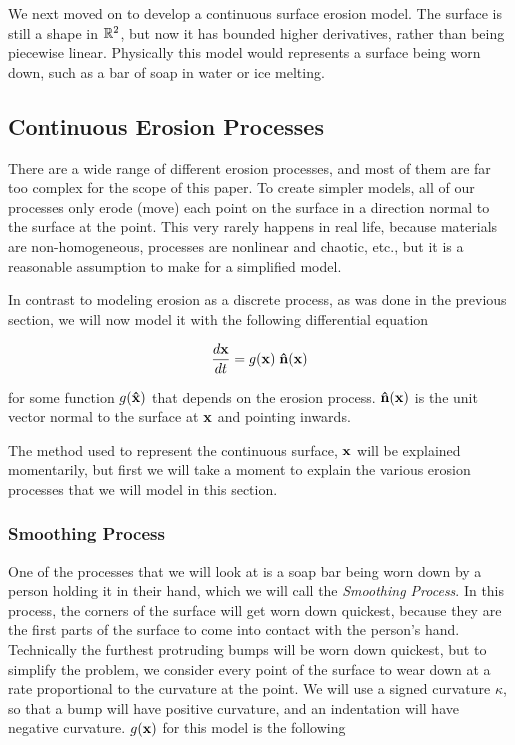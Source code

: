 We next moved on to develop a continuous surface erosion model. The surface is still a shape in $\mathbb R^2$, but now it has bounded higher derivatives, rather than being piecewise linear. Physically this model would represents a surface being worn down, such as a bar of soap in water or ice melting. 

\subsection*{Continuous Erosion Processes}

There are a wide range of different erosion processes, and most of them are far too complex for the scope of this paper. To create simpler models, all of our processes only erode (move) each point on the surface in a direction normal to the surface at the point. This very rarely happens in real life, because materials are non-homogeneous, processes are nonlinear and chaotic, etc., but it is a reasonable assumption to make for a simplified model.

In contrast to modeling erosion as a discrete process, as was done in the previous section, we will now model it with the following differential equation

\begin{equation}
\label{eq:erosion-diff-eq}
\frac{d\mathbf{x}}{dt} = g(\mathbf{x}) \; \mathbf{\hat{n}}(\mathbf{x})
\end{equation}

for some function $g(\mathbf{\hat{x}})$ that depends on the erosion process. $\mathbf{\hat{n}}(\mathbf{x})$ is the unit vector normal to the surface at $\mathbf{x}$ and pointing inwards.

The method used to represent the continuous surface, $\mathbf{x}$ will be explained momentarily, but first we will take a moment to explain the various erosion processes that we will model in this section.

\subsubsection*{Smoothing Process}

One of the processes that we will look at is a soap bar being worn down by a person holding it in their hand, which we will call the \textit{Smoothing Process}. In this process, the corners of the surface will get worn down quickest, because they are the first parts of the surface to come into contact with the person's hand. Technically the furthest protruding bumps will be worn down quickest, but to simplify the problem, we consider every point of the surface to wear down at a rate proportional to the curvature at the point. We will use a signed curvature $\kappa$, so that a bump will have positive curvature, and an indentation will have negative curvature. $g(\mathbf{x})$ for this model is the following

